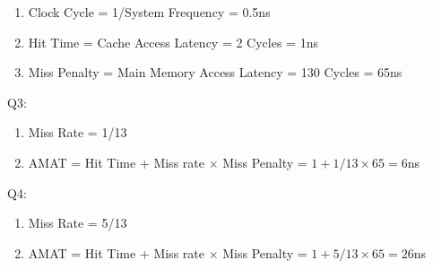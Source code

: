\begin{questions}
{
    \begin{solution}
        \begin{enumerate}[$\bullet$]
            \item Clock Cycle = 1/System Frequency = 0.5ns
            \item Hit Time = Cache Access Latency = 2 Cycles = 1ns
            \item Miss Penalty = Main Memory Access Latency = 130 Cycles = 65ns
        \end{enumerate}
        Q3:
        \begin{enumerate}[$\bullet$]
            \item Miss Rate = 1/13
            \item AMAT = Hit Time + Miss rate $\times$ Miss Penalty = $1+1/13\times 65=6$ns
        \end{enumerate}
        Q4:
        \begin{enumerate}[$\bullet$]
            \item Miss Rate = 5/13
            \item AMAT = Hit Time + Miss rate $\times$ Miss Penalty = $1+5/13\times 65=26$ns
        \end{enumerate}
    \end{solution}
}


\end{questions}
